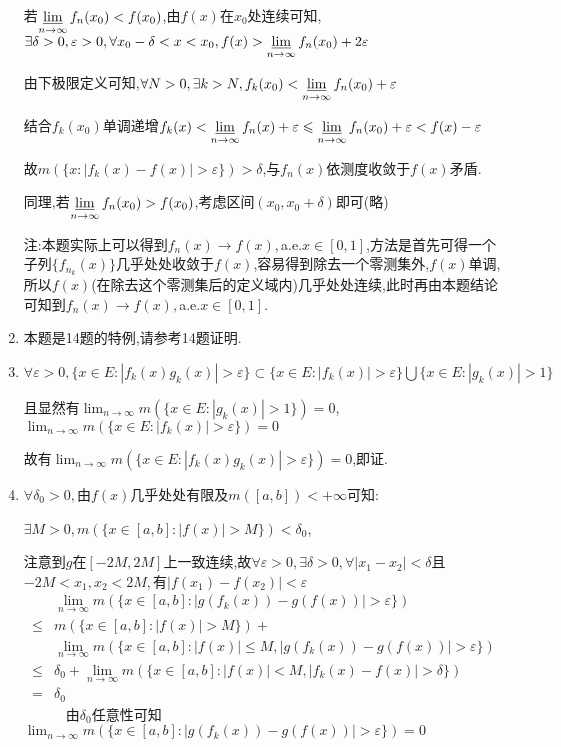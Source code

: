 \documentclass[UTF8, a4paper, 12pt, oneside, onecolumn]{article}
\numberwithin{equation}{section}
\numberwithin{figure}{section}
\numberwithin{table}{section}
\theoremstyle{nonumberplain}	%
\theoremstyle{plain}	%
\theoremstyle{plain}	%
\theoremstyle{plain}	%
\theoremstyle{plain}	%
\theoremstyle{nonumberplain}
\begin{document}
\begin{enumerate}
	若$\displaystyle\varliminf_{n\rightarrow\infty}f_n(x_0)<f(x_0)$,由$f(x)$在$x_0$处连续可知,$\displaystyle\exists \delta>0,\varepsilon>0,\forall x_0-\delta<x<x_0,f(x)>\varliminf_{n\rightarrow\infty}f_n(x_0)+2\varepsilon$
	
	由下极限定义可知,$\displaystyle\forall N>0,\exists k>N,f_k(x_0)<\varliminf_{n\rightarrow\infty}f_n(x_0)+\varepsilon$
	
	结合$f_k(x_0)$单调递增$\displaystyle f_k(x)<\varliminf_{n\rightarrow\infty}f_n(x)+\varepsilon\leqslant\varliminf_{n\rightarrow\infty}f_n(x_0)+\varepsilon<f(x)-\varepsilon$
	
	故$m(\{x:|f_k(x)-f(x)|>\varepsilon\})>\delta$,与$f_n(x)$依测度收敛于$f(x)$矛盾.
	
	同理,若$\displaystyle\varliminf_{n\rightarrow\infty}f_n(x_0)>f(x_0)$,考虑区间$(x_0,x_0+\delta)$即可(略)
	
	注:本题实际上可以得到$f_n(x)\rightarrow f(x),$a.e.$x\in[0,1]$,方法是首先可得一个子列$\{f_{n_k}(x)\}$几乎处处收敛于$f(x)$,容易得到除去一个零测集外,$f(x)$单调,所以$f(x)$(在除去这个零测集后的定义域内)几乎处处连续,此时再由本题结论可知到$f_n(x)\rightarrow f(x),$a.e.$x\in[0,1]$.
	
	\item 本题是14题的特例,请参考14题证明.
	
	\item $\displaystyle\forall\varepsilon>0, \{x\in E:|f_k(x)g_k(x)|>\varepsilon\}\subset \{x\in E:|f_k(x)|>\varepsilon\}\bigcup\{x\in E:|g_k(x)|>1\}$
	
	且显然有$\displaystyle\lim_{n\rightarrow \infty}m(\{x\in E:|g_k(x)|>1\})=0$,$\displaystyle\lim_{n\rightarrow \infty}m(\{x\in E:|f_k(x)|>\varepsilon\})=0$
	
	故有$\displaystyle\lim_{n\rightarrow \infty}m(\{x\in E:|f_k(x)g_k(x)|>\varepsilon\})=0$,即证.
	
	\item $\forall \delta_0>0, $由$f(x)$几乎处处有限及$m([a,b])<+\infty$可知:
	
	$\displaystyle\exists M>0,m(\{x\in[a,b]:|f(x)|>M\})<\delta_0$,
	
	注意到$g$在$[-2M,2M]$上一致连续,故$\forall \varepsilon>0,\exists \delta>0,\forall |x_1-x_2|<\delta$且$-2M<x_1,x_2<2M,$有$|f(x_1)-f(x_2)|<\varepsilon$
	\begin{align*}
	&\displaystyle\lim_{n\rightarrow \infty}m(\{x\in[a,b]:|g(f_k(x))-g(f(x))|>\varepsilon\})\\
	\leqslant& m(\{x\in[a,b]:|f(x)|>M\})+\\
	&\lim_{n\rightarrow \infty}m(\{x\in[a,b]:|f(x)|\leqslant M,|g(f_k(x))-g(f(x))|>\varepsilon\})\\
	\leqslant&\delta_0+\lim_{n\rightarrow \infty}m(\{x\in[a,b]:|f(x)|<M,|f_k(x)-f(x)|>\delta\})\\
	=&\delta_0
	\end{align*}
	~~~~~~由$\delta_0$任意性可知$\displaystyle\lim_{n\rightarrow \infty}m(\{x\in[a,b]:|g(f_k(x))-g(f(x))|>\varepsilon\})=0$
	

\end{enumerate}
\end{document}
